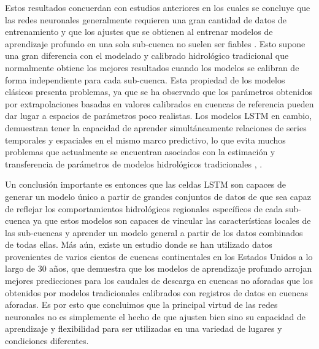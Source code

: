 Estos resultados concuerdan con estudios anteriores en los cuales se concluye que 
las redes neuronales generalmente requieren una gran cantidad de datos de entrenamiento y que 
los ajustes que se obtienen al entrenar modelos de aprendizaje profundo en una sola sub-cuenca no suelen ser fiables \cite{Kratzert}. 
Esto supone una gran diferencia con el modelado y calibrado hidrológico tradicional que normalmente obtiene 
los mejores resultados cuando los modelos se calibran de forma independiente para cada sub-cuenca.
Esta propiedad de los modelos clásicos presenta problemas, ya que se ha observado que los 
 parámetros obtenidos por extrapolaciones  basadas en valores calibrados en cuencas de referencia 
pueden dar lugar a espacios de parámetros poco realistas\cite{Mizukami}. 
Los modelos LSTM en cambio, demuestran tener la capacidad de aprender simultáneamente relaciones de series temporales 
y espaciales en el mismo marco predictivo, lo que evita muchos problemas que actualmente se encuentran 
asociados con la estimación y transferencia de parámetros de modelos hidrológicos tradicionales \cite{Kratzert}, \cite{nearing}.


Un conclusión importante es entonces que las celdas LSTM son capaces de generar un modelo único a partir de grandes conjuntos de datos de 
que sea capaz de reflejar los comportamientos hidrológicos regionales específicos de cada sub-cuenca
ya que estos modelos son capaces de vincular las características locales de las sub-cuencas y aprender 
un modelo general a partir de los datos combinados de todas ellas. 
Más aún, existe un estudio donde se han utilizado datos provenientes de varios cientos de cuencas continentales en los Estados Unidos
a lo largo de 30 años, que demuestra que los modelos de aprendizaje profundo arrojan mejores predicciones para los caudales de descarga  
en cuencas no aforadas que los obtenidos por modelos tradicionales calibrados con registros de datos en cuencas aforadas\cite{nearing}\cite{Kratzert}.
Es por esto que concluimos que la principal virtud de las redes neuronales no es simplemente el hecho de que ajusten bien sino su capacidad de
aprendizaje y  flexibilidad para ser utilizadas en una variedad de  lugares y condiciones diferentes.

